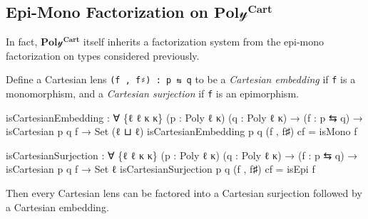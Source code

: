 \documentclass[
  11pt,
  oneside,
  article]{memoir}
\newenvironment{Shaded}{}{}
\newcommand{\DataTypeTok}[1]{\textcolor[rgb]{0.56,0.13,0.00}{#1}}
\newcommand{\NormalTok}[1]{#1}
\newcommand{\OtherTok}[1]{\textcolor[rgb]{0.00,0.44,0.13}{#1}}
\theoremstyle{definition}
\theoremstyle{plain}
\newcommand{\yon}{\mathcal{y}}
\newcommand{\0}{\textsf{0}}
\newcommand{\1}{\tn{\textsf{1}}}
\begin{document}
\subsection{\texorpdfstring{Epi-Mono Factorization on
\(\mathbf{Pol\yon^{Cart}}\)}{Epi-Mono Factorization on \textbackslash mathbf\{Poly\^{}\{Cart\}\}}}\label{epi-mono-factorization-on-mathbfpolycart}

In fact, \(\mathbf{Pol\yon^{Cart}}\) itself inherits a factorization system
from the epi-mono factorization on types considered previously.

Define a Cartesian lens \texttt{(f\ ,\ f♯)\ :\ p\ ⇆\ q} to be a
\emph{Cartesian embedding} if \texttt{f} is a monomorphism, and a
\emph{Cartesian surjection} if \texttt{f} is an epimorphism.

\begin{Shaded}
\begin{Highlighting}[]
\NormalTok{isCartesianEmbedding }\OtherTok{:} \OtherTok{∀} \OtherTok{\{}\NormalTok{ℓ ℓ\textquotesingle{} κ κ\textquotesingle{}}\OtherTok{\}} \OtherTok{(}\NormalTok{p }\OtherTok{:}\NormalTok{ Poly ℓ κ}\OtherTok{)} \OtherTok{(}\NormalTok{q }\OtherTok{:}\NormalTok{ Poly ℓ\textquotesingle{} κ\textquotesingle{}}\OtherTok{)}
                       \OtherTok{→} \OtherTok{(}\NormalTok{f }\OtherTok{:}\NormalTok{ p ⇆ q}\OtherTok{)} \OtherTok{→}\NormalTok{ isCartesian p q f }\OtherTok{→} \DataTypeTok{Set} \OtherTok{(}\NormalTok{ℓ ⊔ ℓ\textquotesingle{}}\OtherTok{)}
\NormalTok{isCartesianEmbedding p q }\OtherTok{(}\NormalTok{f , f♯}\OtherTok{)}\NormalTok{ cf }\OtherTok{=}\NormalTok{ isMono f}

\NormalTok{isCartesianSurjection }\OtherTok{:} \OtherTok{∀} \OtherTok{\{}\NormalTok{ℓ ℓ\textquotesingle{} κ κ\textquotesingle{}}\OtherTok{\}} \OtherTok{(}\NormalTok{p }\OtherTok{:}\NormalTok{ Poly ℓ κ}\OtherTok{)} \OtherTok{(}\NormalTok{q }\OtherTok{:}\NormalTok{ Poly ℓ\textquotesingle{} κ\textquotesingle{}}\OtherTok{)}
                        \OtherTok{→} \OtherTok{(}\NormalTok{f }\OtherTok{:}\NormalTok{ p ⇆ q}\OtherTok{)} \OtherTok{→}\NormalTok{ isCartesian p q f }\OtherTok{→} \DataTypeTok{Set}\NormalTok{ ℓ\textquotesingle{}}
\NormalTok{isCartesianSurjection p q }\OtherTok{(}\NormalTok{f , f♯}\OtherTok{)}\NormalTok{ cf }\OtherTok{=}\NormalTok{ isEpi f}
\end{Highlighting}
\end{Shaded}

Then every Cartesian lens can be factored into a Cartesian surjection
followed by a Cartesian embedding.
\end{document}
